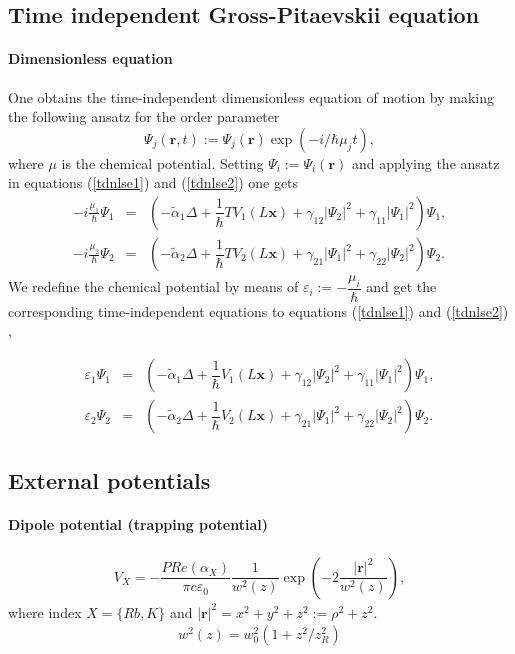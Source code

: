 \documentclass[12pt]{article}
\begin{document}
\subsection{Time independent Gross-Pitaevskii equation}
\paragraph{Dimensionless equation}
One obtains the time-independent dimensionless equation of motion by making the following ansatz for the order parameter
\begin{equation}
 \Psi_j(\mathbf{r},t):=\Psi_j(\mathbf{r}) \exp{\left(-i/\hbar \mu_j t\right)},
\end{equation}
where $\mu$ is the chemical potential.  
Setting $\Psi_i:=\Psi_i(\mathbf{r})$ and applying the ansatz in equations (\ref{tdnlse1}) and (\ref{tdnlse2}) one gets
\begin{eqnarray}
-i\frac{\mu_1}{\hbar}\Psi_1&=&\left(-\tilde{\alpha}_1 \Delta + \dfrac{1}{\hbar} TV_1(L\mathbf{x}) + \gamma_{12} \vert\Psi_2\vert^2 + \gamma_{11} \vert\Psi_1\vert^2\right)\Psi_1, \nonumber \\
-i\frac{\mu_2}{\hbar}\Psi_2&=&\left(-\tilde{\alpha}_2 \Delta + \dfrac{1}{\hbar} TV_2(L\mathbf{x}) + \gamma_{21} \vert\Psi_1\vert^2 + \gamma_{22}\vert\Psi_2\vert^2\right)\Psi_2. \nonumber
\end{eqnarray}
We redefine the chemical potential by means of $\varepsilon_i:=-\dfrac{ \mu_i}{\hbar}$ and get the corresponding time-independent equations to equations (\ref{tdnlse1}) and (\ref{tdnlse2}) ,
\begin{center}
\begin{tcolorbox}
\begin{eqnarray}
\varepsilon_1 \Psi_1 &=&\left(-\tilde{\alpha}_1 \Delta + \dfrac{1}{\hbar} V_1(L\mathbf{x}) + \gamma_{12} \vert\Psi_2\vert^2 + \gamma_{11}\vert\Psi_1\vert^2\right)\Psi_1, \label{tinlse1} \\
\varepsilon_2 \Psi_2 &=&\left(-\tilde{\alpha}_2 \Delta + \dfrac{1}{\hbar} V_2(L\mathbf{x}) + \gamma_{21} \vert\Psi_1\vert^2 + \gamma_{22} \vert\Psi_2\vert^2\right)\Psi_2. \label{tinlse2}
\end{eqnarray}
\end{tcolorbox}
\end{center}


\subsection{External potentials }
\paragraph{Dipole potential (trapping potential)}
\begin{align}
V_X = - \dfrac{P Re(\alpha_X)}{\pi c \varepsilon_0} \dfrac{1}{w^2(z)} \exp\left( -2\dfrac{|\mathbf{r}|^2}{w^2(z)} \right) \label{optdippot1},
\end{align}
where index $X=\{Rb, K\}$ and $|\mathbf{r}|^2= x^2+y^2+z^2 := \rho^2+z^2$.
\begin{align}
w^2(z) = w_0^2\left(1+z^2/z^2_R\right)
\end{align}
\end{document}

